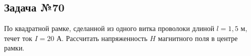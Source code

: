 \subsection{Задача №70}

По квадратной рамке, сделанной из одного витка проволоки длиной $l = 1,5$ м, течет ток $I = 20$ А. Рассчитать напряженность $H$ магнитного поля в центре рамки.